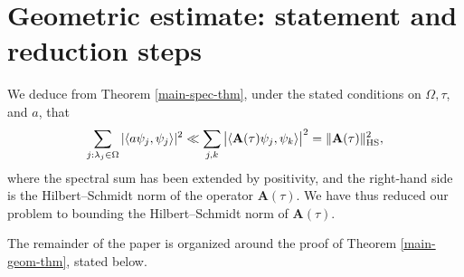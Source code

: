 \documentclass[12pt]{amsart}
\theoremstyle{remark}
\begin{document}
\section{Geometric estimate: statement and reduction steps}\label{sec:geom-reduction}

We deduce from Theorem \ref{main-spec-thm}, under the stated conditions on $\Omega, \tau$, and $a$, that
\[
\sum_{j: \lambda_j\in\Omega} |\langle a\psi_j,\psi_j\rangle|^2\ll \sum_{j,k}\big |\langle \mathbf{A}(\tau)\psi_j,\psi_k\rangle\big|^2=\|\mathbf{A}(\tau)\|_{\rm HS}^2,
\]
where the spectral sum has been extended by positivity, and the right-hand side is the Hilbert--Schmidt norm of the operator $\mathbf{A}(\tau)$. We have thus reduced our problem to bounding the Hilbert--Schmidt norm of $\mathbf{A}(\tau)$.

The remainder of the paper is organized around the proof of Theorem \ref{main-geom-thm}, stated below. 

\end{document}
